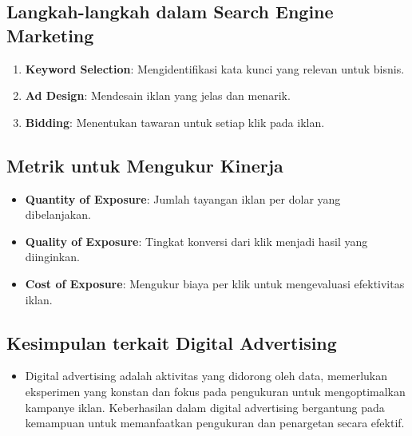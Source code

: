 \documentclass{article}
\begin{document}
\subsection{Langkah-langkah dalam Search Engine Marketing}
\begin{enumerate}
    \item \textbf{Keyword Selection}: Mengidentifikasi kata kunci yang relevan untuk bisnis.
    \item \textbf{Ad Design}: Mendesain iklan yang jelas dan menarik.
    \item \textbf{Bidding}: Menentukan tawaran untuk setiap klik pada iklan.
\end{enumerate}

\subsection{Metrik untuk Mengukur Kinerja}
\begin{itemize}
    \item \textbf{Quantity of Exposure}: Jumlah tayangan iklan per dolar yang dibelanjakan.
    \item \textbf{Quality of Exposure}: Tingkat konversi dari klik menjadi hasil yang diinginkan.
    \item \textbf{Cost of Exposure}: Mengukur biaya per klik untuk mengevaluasi efektivitas iklan.
\end{itemize}

\subsection{Kesimpulan terkait Digital Advertising}
\begin{itemize}
    \item Digital advertising adalah aktivitas yang didorong oleh data, memerlukan eksperimen yang konstan dan fokus pada pengukuran untuk mengoptimalkan kampanye iklan. Keberhasilan dalam digital advertising bergantung pada kemampuan untuk memanfaatkan pengukuran dan penargetan secara efektif.
\end{itemize}

\end{document}
